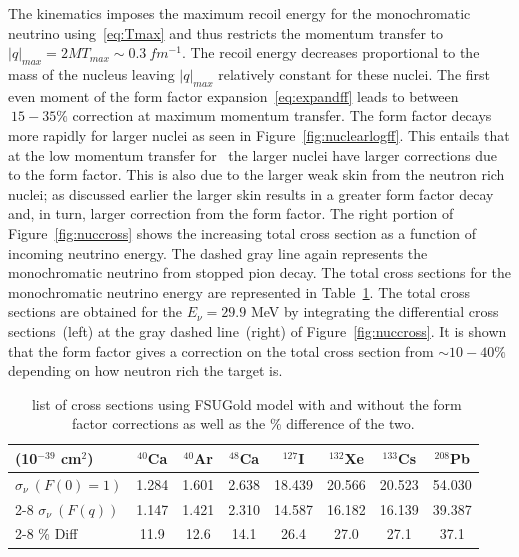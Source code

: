The kinematics imposes the maximum recoil energy for the monochromatic neutrino using~\eqref{eq:Tmax} and thus restricts the momentum transfer to $|q|_{max}=2MT_{max} \sim 0.3\ fm^{-1}$. The recoil energy decreases proportional to the mass of the nucleus leaving $|q|_{max}$ relatively constant for these nuclei. The first even moment of the form factor expansion~\eqref{eq:expandff} leads to between $~15-35\% $ correction at maximum momentum transfer. The form factor decays more rapidly for larger nuclei as seen in Figure~\ref{fig:nuclearlogff}. This entails that at the low momentum transfer for \cevns\ the larger nuclei have larger corrections due to the form factor. This is also due to the larger weak skin from the neutron rich nuclei; as discussed earlier the larger skin results in a greater form factor decay and, in turn, larger correction from the form factor. The right portion of Figure~\ref{fig:nuccross} shows the increasing total cross section as a function of incoming neutrino energy. The dashed gray line again represents the monochromatic neutrino from stopped pion decay. The total cross sections for the monochromatic neutrino energy are represented in Table~\ref{table:nuccross}. The total cross sections are obtained for the $E_{\nu}=29.9$ MeV by integrating the differential cross sections~(left) at the gray dashed line~(right) of Figure~\ref{fig:nuccross}. It is shown that the form factor gives a correction on the total cross section from $\sim 10-40\%$ depending on how neutron rich the target is. 

\begin{table}%
\centering
\caption{\cevns\ list of cross sections using FSUGold model with and without the form factor corrections as well as the \% difference of the two.}
\label{table:nuccross}
\begin{tabular}{l || *{7}{c}}
\hline\hline
(10$^{-39}$ cm$^{2}$) & $^{40}$Ca & $^{40}$Ar & $^{48}$Ca & $^{127}$I & $^{132}$Xe & $^{133}$Cs & $^{208}$Pb \\
\hline
$\sigma _{\nu}\ (F(0)=1)$ & 1.284 & 1.601 & 2.638 & 18.439 & 20.566 & 20.523 & 54.030 \\ 
\cline{2-8}
$\sigma _{\nu}\ (F(q))$ & 1.147 & 1.421 & 2.310 & 14.587 & 16.182 &  16.139 & 39.387 \\
\cline{2-8}
\% Diff & 11.9 & 12.6 & 14.1 & 26.4 & 27.0 & 27.1 & 37.1 \\
\hline\hline
\end{tabular}
\end{table}

